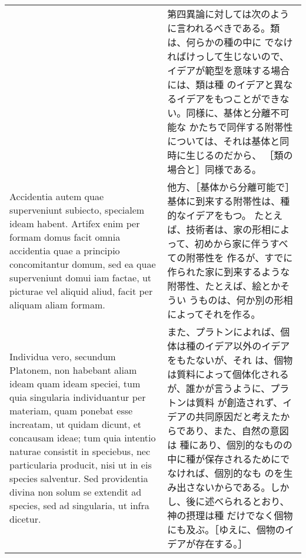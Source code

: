 \documentclass[10pt]{jsarticle} %
\begin{document}
\begin{longtable}{p{21em}p{21em}}
&

第四異論に対しては次のように言われるべきである。類は、何らかの種の中に
でなければけっして生じないので、イデアが範型を意味する場合には、類は種
のイデアと異なるイデアをもつことができない。同様に、基体と分離不可能な
かたちで同伴する附帯性については、それは基体と同時に生じるのだから、
［類の場合と］同様である。

\\

Accidentia autem quae superveniunt subiecto, specialem ideam
habent. Artifex enim per formam domus facit omnia accidentia quae a
principio concomitantur domum, sed ea quae superveniunt domui iam
factae, ut picturae vel aliquid aliud, facit per aliquam aliam formam.

&

他方、［基体から分離可能で］基体に到来する附帯性は、種的なイデアをもつ。
たとえば、技術者は、家の形相によって、初めから家に伴うすべての附帯性を
作るが、すでに作られた家に到来するような附帯性、たとえば、絵とかそうい
うものは、何か別の形相によってそれを作る。


\\

Individua vero, secundum Platonem, non habebant aliam ideam quam ideam
speciei, tum quia singularia individuantur per materiam, quam ponebat
esse increatam, ut quidam dicunt, et concausam ideae; tum quia
intentio naturae consistit in speciebus, nec particularia producit,
nisi ut in eis species salventur. Sed providentia divina non solum se
extendit ad species, sed ad singularia, ut infra dicetur.

&

また、プラトンによれば、個体は種のイデア以外のイデアをもたないが、それ
は、個物は質料によって個体化されるが、誰かが言うように、プラトンは質料
が創造されず、イデアの共同原因だと考えたからであり、また、自然の意図は
種にあり、個別的なものの中に種が保存されるためにでなければ、個別的なも
のを生み出さないからである。しかし、後に述べられるとおり、神の摂理は種
だけでなく個物にも及ぶ。［ゆえに、個物のイデアが存在する。］
\end{longtable}
\end{document}
